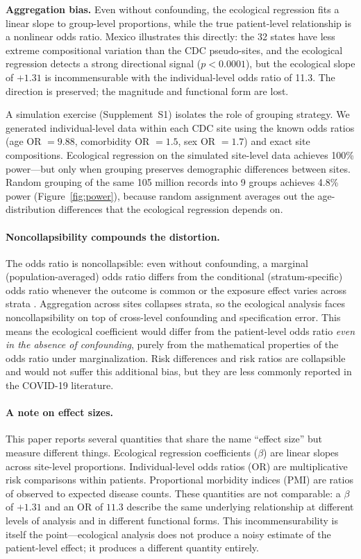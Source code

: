 \documentclass[11pt]{article}
\begin{document}
\textbf{Aggregation bias.}  Even without confounding, the ecological
regression fits a linear slope to group-level proportions, while the
true patient-level relationship is a nonlinear odds ratio.  Mexico
illustrates this directly: the 32 states have less extreme compositional
variation than the CDC pseudo-sites, and the ecological regression detects
a strong directional signal ($p < 0.0001$), but the ecological slope of
$+1.31$ is incommensurable with the individual-level odds ratio of 11.3.
The direction is preserved; the magnitude and functional form are lost.

A simulation exercise (Supplement~S1) isolates the role of grouping
strategy.  We generated individual-level data within each CDC site using
the known odds ratios (age OR $= 9.88$, comorbidity OR $= 1.5$, sex
OR $= 1.7$) and exact site compositions.  Ecological regression on the
simulated site-level data achieves 100\% power---but only when grouping
preserves demographic differences between sites.  Random grouping of the
same 105 million records into 9 groups achieves 4.8\% power
(Figure~\ref{fig:power}), because random assignment averages out the
age-distribution differences that the ecological regression depends on.

\paragraph{Noncollapsibility compounds the distortion.}
The odds ratio is noncollapsible: even without confounding, a marginal
(population-averaged) odds ratio differs from the conditional
(stratum-specific) odds ratio whenever the outcome is common or the
exposure effect varies across strata
\cite{greenland1999noncollapsibility}.  Aggregation across sites
collapses strata, so the ecological analysis faces noncollapsibility on
top of cross-level confounding and specification error.  This means the
ecological coefficient would differ from the patient-level odds ratio
\emph{even in the absence of confounding}, purely from the mathematical
properties of the odds ratio under marginalization.  Risk differences and
risk ratios are collapsible and would not suffer this additional bias,
but they are less commonly reported in the COVID-19 literature.

\paragraph{A note on effect sizes.}
This paper reports several quantities that share the name ``effect size''
but measure different things.  Ecological regression coefficients ($\beta$)
are linear slopes across site-level proportions.  Individual-level odds
ratios (OR) are multiplicative risk comparisons within patients.
Proportional morbidity indices (PMI) are ratios of observed to expected
disease counts.  These quantities are not comparable: a $\beta$ of $+1.31$
and an OR of $11.3$ describe the same underlying relationship at different
levels of analysis and in different functional forms.  This
incommensurability is itself the point---ecological analysis does not
produce a noisy estimate of the patient-level effect; it produces a
different quantity entirely.
\end{document}
